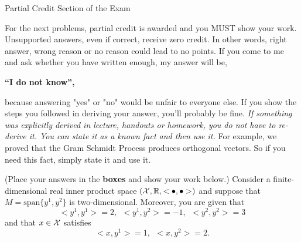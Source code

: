 \documentclass[letterpaper]{article}
\newcommand{\real}{\mathbb R}  %
\newcommand{\spanof}[1]{\textrm{span} \{ #1 \}}
\begin{document}
\newpage

\vspace*{.7in}
\begin{center}
\huge

Partial Credit Section of the Exam

\end{center}



\vspace*{1in}

{\Large  For the next problems, partial credit is awarded and you MUST show your work. Unsupported answers, even if correct, receive zero credit. In other words, right answer, wrong
reason or no reason could lead to no points. If you come to me and ask whether you have written enough, my answer will be,
\begin{center}
\bf ``I do not know'',
\end{center}
 because answering "yes" or "no"  would be unfair to everyone else. If you show the steps you followed in deriving your answer, you'll probably be fine.
  \emph{If something was explicitly derived in lecture, handouts or homework, you do not have to re-derive it. You can state it as a known fact and then use it.} For example, we proved that the Gram Schmidt Process produces orthogonal vectors. So if you need this fact, simply state it and use it.}

%
%



  \newpage

  (Place your answers in the \textbf{boxes} and show your work below.) Consider a finite-dimensional real inner product space  $({\cal X}, \real, <\bullet, \bullet>)$ and suppose that $M=\spanof{y^1,y^2}$ is two-dimensional. Moreover, you are given that $$<y^1,y^1>=2,~~ <y^1,y^2>=-1,~~<y^2,y^2>=3$$
and that $x\in {\cal X}$ satisfies
$$<x,y^1>=1,~~ <x,y^2>=2.$$
\end{document}

